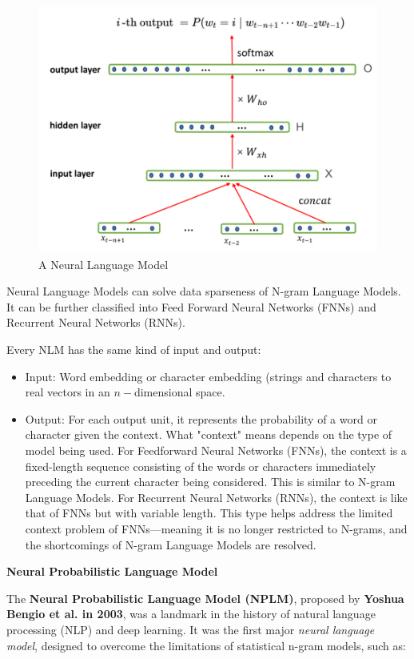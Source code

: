 \begin{figure}[h]
    \centering
    \includegraphics[width=0.8\linewidth]{img/chap04/neuralmodel.png}
    \caption{A Neural Language Model}
    \label{fig:neuralmodel}
\end{figure}

Neural Language Models can solve data sparseness of N-gram Language Models. It can be further classified into Feed Forward Neural Networks (FNNs) and Recurrent Neural Networks (RNNs).

Every NLM has the same kind of input and output:

\begin{itemize}
    \item Input: Word embedding or character embedding (strings and characters to real vectors in an $n-$dimensional space.
    \item Output: For each output unit, it represents the probability of a word or character given the context. What "context" means depends on the type of model being used. For Feedforward Neural Networks (FNNs), the context is a fixed-length sequence consisting of the words or characters immediately preceding the current character being considered. This is similar to N-gram Language Models. For Recurrent Neural Networks (RNNs), the context is like that of FNNs but with variable length. This type helps address the limited context problem of FNNs—meaning it is no longer restricted to N-grams, and the shortcomings of N-gram Language Models are resolved.
\end{itemize}

\textbf{Neural Probabilistic Language Model}

The \textbf{Neural Probabilistic Language Model (NPLM)}, proposed by \textbf{Yoshua Bengio et al. in 2003}, was a landmark in the history of natural language processing (NLP) and deep learning. It was the first major \textit{neural language model}, designed to overcome the limitations of statistical n-gram models, such as:

